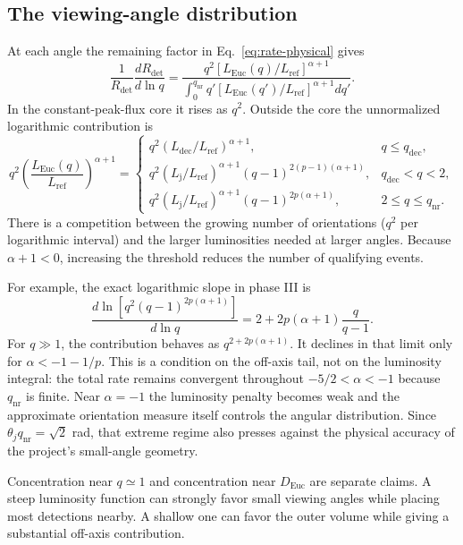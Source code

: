 \documentclass[11pt,a4paper]{article}
\newcommand{\Euc}{\mathrm{Euc}}
\newcommand{\dec}{\mathrm{dec}}
\newcommand{\nr}{\mathrm{nr}}
\newcommand{\Lref}{L_{\mathrm{ref}}}
\newcommand{\Ldec}{L_{\mathrm{dec}}}
\newcommand{\Lj}{L_{\mathrm j}}
\newcommand{\Rdet}{R_{\mathrm{det}}}
\begin{document}
\subsection{The viewing-angle distribution}
At each angle the remaining factor in Eq.~\eqref{eq:rate-physical} gives
\begin{equation}
 \frac1{\Rdet}\frac{d\Rdet}{d\ln q}
 =\frac{q^2[L_\Euc(q)/\Lref]^{\alpha+1}}
 {\displaystyle\int_0^{q_\nr}q'[L_\Euc(q')/\Lref]^{\alpha+1}dq'}.
 \label{eq:logq}
\end{equation}
In the constant-peak-flux core it rises as $q^2$. Outside the core the
unnormalized logarithmic contribution is
\begin{equation}
 q^2\left(\frac{L_\Euc(q)}{\Lref}\right)^{\alpha+1}
 =\begin{cases}
 q^2(\Ldec/\Lref)^{\alpha+1},&q\le q_\dec,\\
 q^2(\Lj/\Lref)^{\alpha+1}(q-1)^{2(p-1)(\alpha+1)},&q_\dec<q<2,\\
 q^2(\Lj/\Lref)^{\alpha+1}(q-1)^{2p(\alpha+1)},&2\le q\le q_\nr.
 \end{cases}
 \label{eq:angular-branches}
\end{equation}
There is a competition between the growing number of orientations
($q^2$ per logarithmic interval) and the larger luminosities needed at
larger angles. Because $\alpha+1<0$, increasing the threshold reduces the
number of qualifying events.

For example, the exact logarithmic slope in phase III is
\begin{equation}
 \frac{d\ln[q^2(q-1)^{2p(\alpha+1)}]}{d\ln q}
 =2+2p(\alpha+1)\frac q{q-1}.
 \label{eq:q-slope}
\end{equation}
For $q\gg1$, the contribution behaves as $q^{2+2p(\alpha+1)}$.
It declines in that limit only for $\alpha<-1-1/p$.
This is a condition on the off-axis tail, not on the luminosity integral:
the total rate remains convergent throughout $-5/2<\alpha<-1$ because
$q_\nr$ is finite.
Near $\alpha=-1$ the luminosity penalty becomes weak and the approximate
orientation measure itself controls the angular distribution.
Since $\theta_jq_\nr=\sqrt2$ rad, that extreme regime also presses against
the physical accuracy of the project's small-angle geometry.

Concentration near $q\simeq1$ and concentration near $D_\Euc$ are separate
claims. A steep luminosity function can strongly favor small viewing angles
while placing most detections nearby. A shallow one can favor the outer
volume while giving a substantial off-axis contribution.
\end{document}
